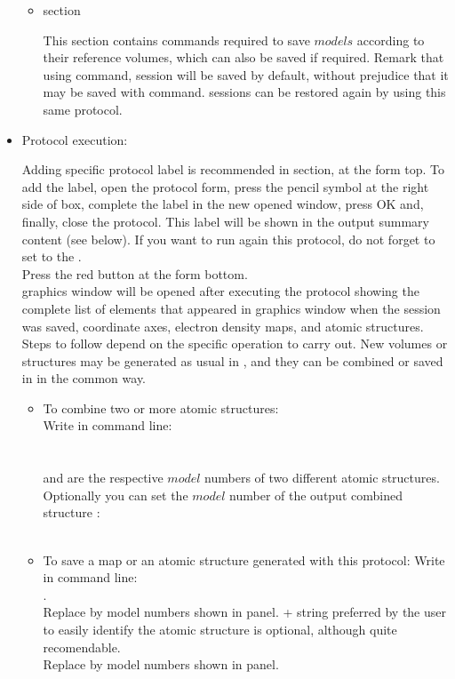 \begin{itemize}
\begin{itemize}
\begin{itemize}
    \end{itemize}
    \item {} section
    
    This section contains \chimera commands required to save $models$ according to their reference volumes, which can also be saved if required. Remark that using  command, \chimera session will be saved by default, without prejudice that it may be saved with  command. \chimera sessions can be restored again by using this same  protocol.
    
    \end{itemize}

  \item Protocol execution:
  
  Adding specific protocol label is recommended in  section, at the form top. To add the label, open the protocol form, press the pencil symbol at the right side of  box, complete the label in the new opened window, press OK and, finally, close the protocol. This label will be shown in the output summary content (see below). If you want to run again this protocol, do not forget to set to  the .\\
  Press the  red button at the form bottom.\\
  
  \chimera graphics window will be opened after executing the protocol showing the complete list of elements that appeared in \chimera graphics window when the session was saved, coordinate axes, electron density maps, and atomic structures. Steps to follow depend on the specific operation to carry out. New volumes or structures may be generated as usual in \chimera, and they can be combined or saved in \scipion in the common way.
  \begin{itemize}
   \item To combine two or more atomic structures:\\
   Write in \chimera command line:\\
   \\
   \\
    and  are the respective $model$ numbers of two different atomic structures. Optionally you can set the $model$ number of the output combined structure :\\
   \\
   \item To save a map or an atomic structure generated with this protocol:
   Write in \chimera command line:\\
   .\\Replace {} by model numbers shown in \chimera {} panel.  + string preferred by the user to easily identify the atomic structure is optional, although quite recomendable.\\
   Replace  by model numbers shown in \chimera {} panel. 
   

\end{itemize}
\end{itemize}
